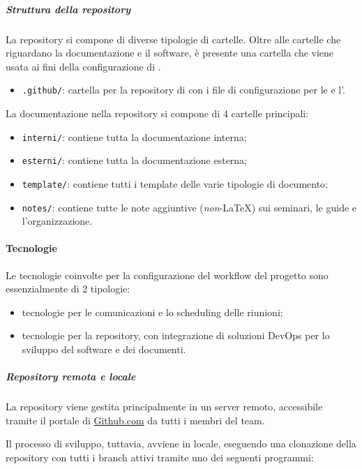 		\subparagraph{Struttura della repository}


		La repository si compone di diverse tipologie di cartelle. Oltre alle cartelle che riguardano la documentazione e il software, è presente una cartella che viene usata ai fini della configurazione di .
		\begin{itemize}
			\item \verb!.github/!: cartella per la repository di  con i file di configurazione per le  e l'.
		\end{itemize}

		La documentazione nella repository si compone di 4 cartelle principali:
		\begin{itemize}
			\item \verb!interni/!: contiene tutta la documentazione interna;
			\item \verb!esterni/!: contiene tutta la documentazione esterna;
			\item \verb!template/!: contiene tutti i template delle varie tipologie di documento;
			\item \verb!notes/!: contiene tutte le note aggiuntive (\textit{non}-\LaTeX{}) sui seminari, le guide e l'organizzazione.
		\end{itemize}


	\paragraph{Tecnologie}

	Le tecnologie coinvolte per la configurazione del workflow del progetto sono essenzialmente di 2 tipologie:
	\begin{itemize}
		\item tecnologie per le comunicazioni e lo scheduling delle riunioni;
		\item tecnologie per la repository, con integrazione di soluzioni DevOps per lo sviluppo del software e dei documenti.
	\end{itemize}

		\subparagraph{Repository remota e locale}

		La repository viene gestita principalmente in un server remoto, accessibile tramite il portale di \href{https://github.com}{Github.com} da tutti i membri del team.

		Il processo di sviluppo, tuttavia, avviene in locale, eseguendo una clonazione della repository con tutti i branch attivi tramite uno dei seguenti programmi:

